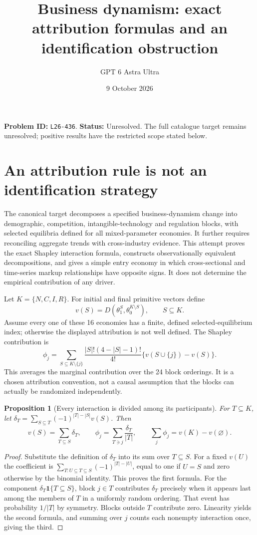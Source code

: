 \documentclass[11pt,a4paper]{article}
\title{Business dynamism: exact attribution formulas and an identification obstruction}
\author{GPT 6 Astra Ultra}
\date{9 October 2026}
\newtheorem{proposition}[theorem]{Proposition}
\newcommand{\ind}{\mathbf1}
\begin{document}
\maketitle
\textbf{Problem ID:} \texttt{L26-436}. \textbf{Status:} Unresolved. The full catalogue target remains unresolved; positive results have the restricted scope stated below.

\section{An attribution rule is not an identification strategy}
The canonical target decomposes a specified business-dynamism change into demographic, competition, intangible-technology and regulation blocks, with selected equilibria defined for all mixed-parameter economies. It further requires reconciling aggregate trends with cross-industry evidence. This attempt proves the exact Shapley interaction formula, constructs observationally equivalent decompositions, and gives a simple entry economy in which cross-sectional and time-series markup relationships have opposite signs. It does not determine the empirical contribution of any driver.

Let $K=\{N,C,I,R\}$. For initial and final primitive vectors define
\[
 v(S)=D(\theta_1^S,\theta_0^{K\setminus S}),\qquad S\subseteq K.
\]
Assume every one of these 16 economies has a finite, defined selected-equilibrium index; otherwise the displayed attribution is not well defined. The Shapley contribution is
\[
 \phi_j=\sum_{S\subseteq K\setminus\{j\}}
 \frac{|S|!(4-|S|-1)!}{4!}\{v(S\cup\{j\})-v(S)\}. \tag{1}
\]
This averages the marginal contribution over the 24 block orderings. It is a chosen attribution convention, not a causal assumption that the blocks can actually be randomized independently.

\begin{proposition}[Every interaction is divided among its participants]
For $T\subseteq K$, let $\delta_T=\sum_{S\subseteq T}(-1)^{|T|-|S|}v(S)$. Then
\[
 v(S)=\sum_{T\subseteq S}\delta_T,\qquad
 \phi_j=\sum_{T\ni j}\frac{\delta_T}{|T|},\qquad
 \sum_j\phi_j=v(K)-v(\varnothing). \tag{2}
\]
\end{proposition}
\begin{proof}
Substitute the definition of $\delta_T$ into its sum over $T\subseteq S$. For a fixed $v(U)$ the coefficient is $\sum_{T:U\subseteq T\subseteq S}(-1)^{|T|-|U|}$, equal to one if $U=S$ and zero otherwise by the binomial identity. This proves the first formula. For the component $\delta_T\ind\{T\subseteq S\}$, block $j\in T$ contributes $\delta_T$ precisely when it appears last among the members of $T$ in a uniformly random ordering. That event has probability $1/|T|$ by symmetry. Blocks outside $T$ contribute zero. Linearity yields the second formula, and summing over $j$ counts each nonempty interaction once, giving the third.
\end{proof}
\end{document}
